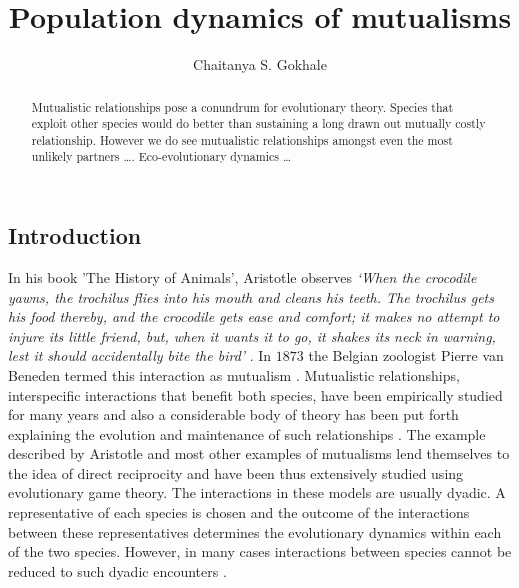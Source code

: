 \documentclass{pnastwo}
\begin{document}
\title{Population dynamics of mutualisms}

 \author{Chaitanya S. Gokhale}


\maketitle

\begin{article}

\begin{abstract}
Mutualistic relationships pose a conundrum for evolutionary theory.
Species that exploit other species would do better than sustaining a long drawn out mutually costly relationship. However we do see mutualistic relationships amongst even the most unlikely partners \ldots.
Eco-evolutionary dynamics \ldots
\end{abstract}



\section{Introduction}

In his book 'The History of Animals', Aristotle observes
{\em
`When the crocodile yawns, the trochilus flies into his mouth and cleans
his teeth. The trochilus gets his food thereby, and the crocodile
gets ease and comfort; it makes no attempt to injure its little friend,
but, when it wants it to go, it shakes its neck in warning, lest it
should accidentally bite the bird'} \cite{aristotle:350bc}.
In $1873$ the Belgian zoologist Pierre van Beneden termed this interaction as mutualism \cite{bronstein:book:2003}.
Mutualistic relationships, interspecific interactions that benefit both species, have been empirically studied for many years 
\cite{boucher:book:1985,hinton:PTENHS:1951,wilson:AmNat:1983,bronstein:QRB:1994,pierce:ARE:2002,kiers:Nature:2003,bshary:ASB:2004} and also a considerable body of theory has been put forth explaining the evolution and maintenance of such relationships \cite{poulin:JTB:1995,doebeli:PNAS:1998,noe:book:2001,johnstone:ECL:2002,bergstrom:PNAS:2003,hoeksema:AmNat:2003,akcay:PRSB:2007,bshary:Nature:2008}.
The example described by Aristotle and most other examples of mutualisms lend themselves to the idea of direct reciprocity \cite{trivers:QRB:1971} and have been thus extensively studied using evolutionary game theory.
The interactions in these models are usually dyadic.
A representative of each species is chosen and the outcome of the interactions between these representatives 
determines the evolutionary dynamics within each of the two species.
However, in many cases interactions between species cannot be reduced to such dyadic encounters \cite{stadler:book:2008}.


\end{article}
\end{document}
